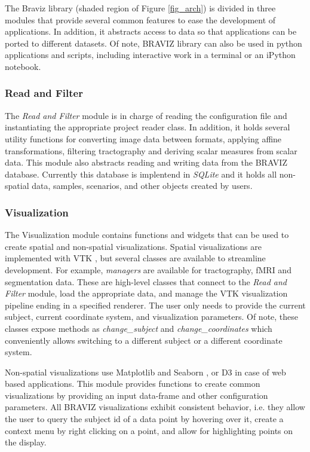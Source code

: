 \documentclass{frontiersHLTH}
\begin{document}
\label{braviz_lib}
The Braviz library (shaded region of Figure \ref{fig_arch}) is divided in three modules that provide several common features to ease the development of applications. In addition, it abstracts access to data so that applications can be ported to different datasets. Of note, BRAVIZ library can also be used in python applications and scripts, including interactive work in a terminal or an iPython notebook.

\subsubsection{Read and Filter}

The \emph{Read and Filter} module is in charge of reading the configuration file and instantiating the appropriate project reader class. In addition, it holds several utility functions for converting image data between formats, applying affine transformations, filtering tractography and deriving scalar measures from scalar data. This module also abstracts reading and writing data from the BRAVIZ database. Currently this database is implentend in \emph{SQLite} \cite{hipp_sqlite_2015} and it holds all non-spatial data, samples, scenarios, and other objects created by users.

\subsubsection{Visualization}

The Visualization module contains functions and widgets that can be used to create spatial and non-spatial visualizations. Spatial visualizations are implemented with VTK \cite{schroeder_design_1996} , but several classes are available to streamline development. For example, \emph{managers} are available for tractography, fMRI and segmentation data. These are high-level classes that connect to the \emph{Read and Filter} module, load the appropriate data, and manage the VTK visualization pipeline ending in a specified renderer. The user only needs to provide the current subject, current coordinate system, and visualization parameters. 
Of note, these classes expose methods as \emph{change\_subject} and \emph{change\_coordinates} which conveniently allows switching to a different subject or a different coordinate system.

Non-spatial visualizations use Matplotlib \cite{hunter_matplotlib:_2007} and Seaborn \cite{michael_waskom_seaborn:_2015}, or D3  \cite{bostock_d3_2011} in case of web based applications. This module provides functions to create common visualizations by providing an input data-frame and other configuration parameters. All BRAVIZ visualizations exhibit consistent behavior, i.e. they  allow the user to query the subject id of a data point by hovering over it, create a context menu by right clicking on a point, and allow for highlighting points on the display. 
\end{document}
